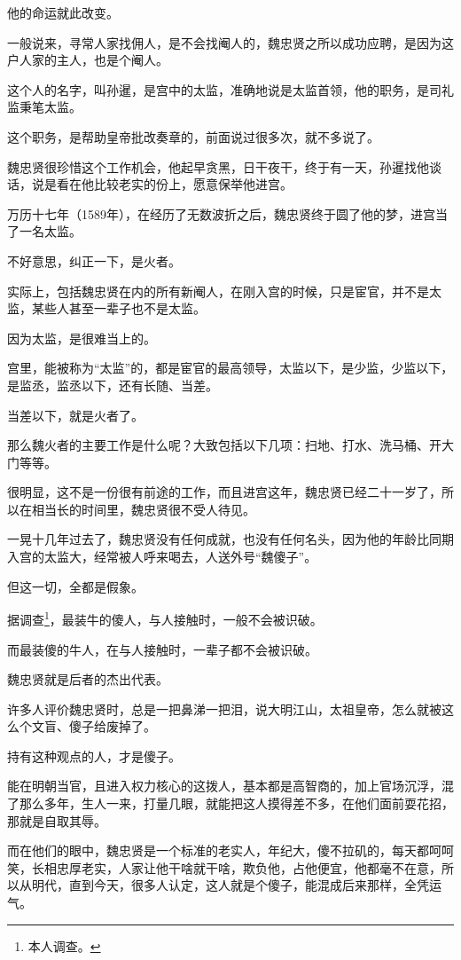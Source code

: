 \begin{multicols}{\theparacolNo}
他的命运就此改变。

一般说来，寻常人家找佣人，是不会找阉人的，魏忠贤之所以成功应聘，是因为这户人家的主人，也是个阉人。

这个人的名字，叫孙暹，是宫中的太监，准确地说是太监首领，他的职务，是司礼监秉笔太监。

这个职务，是帮助皇帝批改奏章的，前面说过很多次，就不多说了。

魏忠贤很珍惜这个工作机会，他起早贪黑，日干夜干，终于有一天，孙暹找他谈话，说是看在他比较老实的份上，愿意保举他进宫。

万历十七年（1589年），在经历了无数波折之后，魏忠贤终于圆了他的梦，进宫当了一名太监。

不好意思，纠正一下，是火者。

实际上，包括魏忠贤在内的所有新阉人，在刚入宫的时候，只是宦官，并不是太监，某些人甚至一辈子也不是太监。

因为太监，是很难当上的。

宫里，能被称为“太监”的，都是宦官的最高领导，太监以下，是少监，少监以下，是监丞，监丞以下，还有长随、当差。

当差以下，就是火者了。

那么魏火者的主要工作是什么呢？大致包括以下几项：扫地、打水、洗马桶、开大门等等。

很明显，这不是一份很有前途的工作，而且进宫这年，魏忠贤已经二十一岁了，所以在相当长的时间里，魏忠贤很不受人待见。

一晃十几年过去了，魏忠贤没有任何成就，也没有任何名头，因为他的年龄比同期入宫的太监大，经常被人呼来喝去，人送外号“魏傻子”。

但这一切，全都是假象。

据调查\footnote{本人调查。}，最装牛的傻人，与人接触时，一般不会被识破。

而最装傻的牛人，在与人接触时，一辈子都不会被识破。

魏忠贤就是后者的杰出代表。

许多人评价魏忠贤时，总是一把鼻涕一把泪，说大明江山，太祖皇帝，怎么就被这么个文盲、傻子给废掉了。

持有这种观点的人，才是傻子。

能在明朝当官，且进入权力核心的这拨人，基本都是高智商的，加上官场沉浮，混了那么多年，生人一来，打量几眼，就能把这人摸得差不多，在他们面前耍花招，那就是自取其辱。

而在他们的眼中，魏忠贤是一个标准的老实人，年纪大，傻不拉矶的，每天都呵呵笑，长相忠厚老实，人家让他干啥就干啥，欺负他，占他便宜，他都毫不在意，所以从明代，直到今天，很多人认定，这人就是个傻子，能混成后来那样，全凭运气。


\end{multicols}
